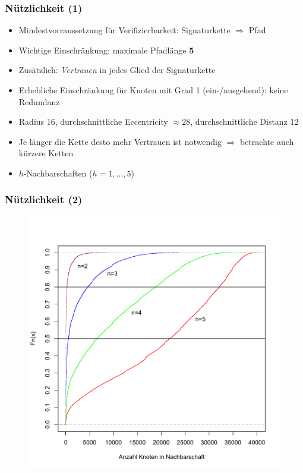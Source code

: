 \documentclass[10pt]{beamer}
\begin{document}
\begin{frame}
  \frametitle{N\"utzlichkeit (1)}
  \begin{itemize}
  \item Mindestvorraussetzung f\"ur Verifizierbarkeit: Signaturkette
    $\Rightarrow$ Pfad
  \item Wichtige Einschr\"ankung: maximale Pfadl\"ange {\bf 5}
  \item Zus\"atzlich: \emph{Vertrauen} in jedes Glied der
    Signaturkette
  \item Erhebliche Einschr\"ankung f\"ur Knoten mit Grad 1
    (ein-/ausgehend): keine Redundanz
  \item Radius 16, durchschnittliche Eccentricity $\approx 28$, durchschnittliche Distanz 12
  \item Je l\"anger die Kette desto mehr Vertrauen ist notwendig
    $\Rightarrow$ betrachte auch k\"urzere Ketten
  \item $h$-Nachbarschaften ($h=1, \dots, 5$)
  \end{itemize}
  
\end{frame}

\begin{frame}
  \frametitle{N\"utzlichkeit (2)}
  \begin{figure}
    \centering
    \includegraphics[scale=0.45]{../ausarbeitung/images/neighbourhood-cdf.pdf}
  \end{figure}
\end{frame}
\end{document}
